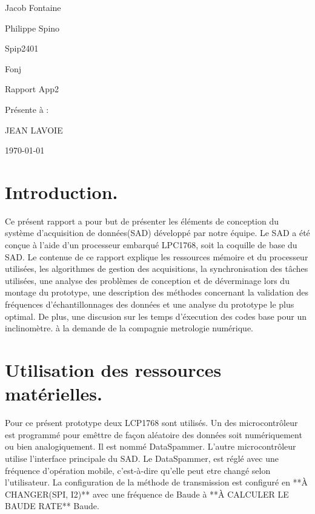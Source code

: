 \documentclass[12pt]{article}
\begin{document}
\begin{titlepage}
	\centering
	{\LARGE Jacob Fontaine \par
	 \LARGE Philippe Spino \par}
	\vspace{1cm}
	\small Spip2401\par
	\small Fonj\par 
	\vspace{3cm}
	{\Large Rapport App2\par}
	\vspace{5cm}
	{\Large Présente à :\par JEAN LAVOIE\par}
	\vspace{4cm}
	\vfill
	{\large \today\par}
\end{titlepage}

\newpage
\tableofcontents
\newpage
\section{Introduction.}
Ce présent rapport a pour but de présenter les éléments de conception du système d'acquisition de données(SAD) développé par notre équipe. Le SAD a été conçue à l'aide d'un processeur embarqué LPC1768, soit la coquille de base du SAD. Le contenue de ce rapport explique les ressources mémoire et du processeur utilisées, les algorithmes de gestion des acquisitions, la synchronisation des tâches utilisées, une analyse des problèmes de conception et de déverminage lors du montage du prototype, une description des méthodes concernant la validation des fréquences d'échantillonnages des données et une analyse du prototype le plus optimal. De plus, une discusion sur les temps d'éxecution des codes base pour un inclinomètre. à la demande de la compagnie metrologie numérique.
\section{Utilisation des ressources matérielles.}
\noindent
Pour ce présent prototype deux LCP1768 sont utilisés. Un des microcontrôleur est programmé pour emêttre de façon aléatoire des données soit numériquement ou bien analogiquement. Il est nommé DataSpammer. L'autre microcontrôleur utilise l'interface principale du SAD. Le DataSpammer, est réglé avec une fréquence d'opération mobile, c'est-à-dire qu'elle peut etre changé selon l'utilisateur. La configuration de la méthode de transmission est configuré en **À CHANGER(SPI, I2)** avec une fréquence de Baude à **À CALCULER LE BAUDE RATE** Baude. 
\end{document}
